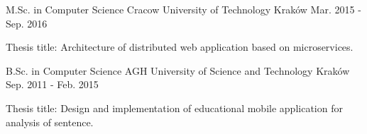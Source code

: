 

\begin{cventries}

  \cventry
    {M.Sc. in Computer Science} %
    {Cracow University of Technology} %
    {Kraków} %
    {Mar. 2015 - Sep. 2016} %
    {
      \begin{cvitems} %
       \item {Thesis title: Architecture of distributed web application based on microservices.}
      \end{cvitems}
    }
    

\vspace{3mm}

  \cventry
    {B.Sc. in Computer Science} %
    {AGH University of Science and Technology} %
    {Kraków} %
    {Sep. 2011 - Feb. 2015} %
    {
      \begin{cvitems} %
       \item {Thesis title: Design and implementation of educational mobile application for analysis of sentence.}
      \end{cvitems}
    }

\end{cventries}
